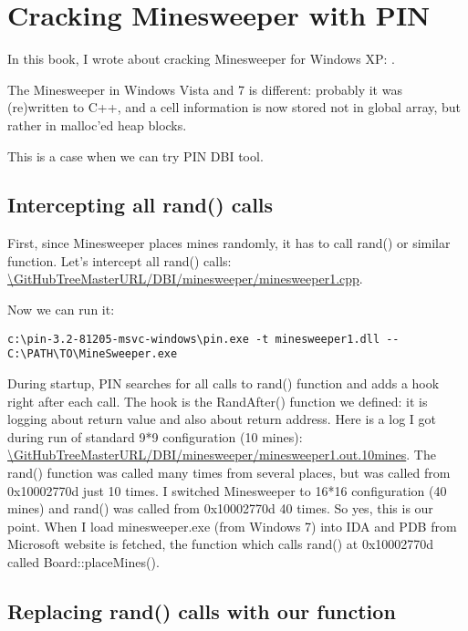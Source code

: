 \section{Cracking Minesweeper with PIN}

\newcommand{\GitHubMinesweeperURL}{\GitHubTreeMasterURL/DBI/minesweeper}

In this book, I wrote about cracking Minesweeper for Windows XP: .

The Minesweeper in Windows Vista and 7 is different: probably it was (re)written to C++, and a cell information
is now stored not in global array, but rather in malloc'ed heap blocks.

This is a case when we can try PIN DBI tool.

\subsection{Intercepting all rand() calls}

First, since Minesweeper places mines randomly, it has to call rand() or similar function.
Let's intercept all rand() calls: \url{\GitHubMinesweeperURL/minesweeper1.cpp}.

Now we can run it:

\begin{lstlisting}
c:\pin-3.2-81205-msvc-windows\pin.exe -t minesweeper1.dll -- C:\PATH\TO\MineSweeper.exe
\end{lstlisting}

During startup, PIN searches for all calls to rand() function and adds a hook right after each call.
The hook is the RandAfter() function we defined: it is logging about return value and also about return address.
Here is a log I got during run of standard 9*9 configuration (10 mines): \url{\GitHubMinesweeperURL/minesweeper1.out.10mines}.
The rand() function was called many times from several places, but was called from 0x10002770d just 10 times.
I switched Minesweeper to 16*16 configuration (40 mines) and rand() was called from 0x10002770d 40 times.
So yes, this is our point.
When I load minesweeper.exe (from Windows 7) into IDA and PDB from Microsoft website is fetched,
the function which calls rand() at 0x10002770d called Board::placeMines().

\subsection{Replacing rand() calls with our function}

